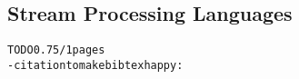 \subsection{Stream Processing Languages}
\begin{alltt}TODO\scriptsize 0.75/1 pages
- citation to make bibtex happy: \cite{arasu_babu_widom_2006}
\end{alltt}
